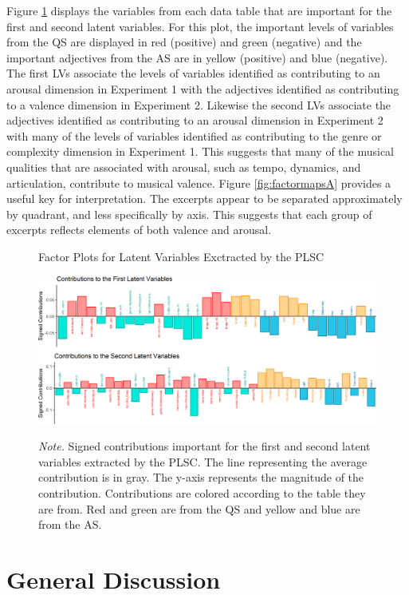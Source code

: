 \documentclass[
  english,
  man,floatsintext]{apa6}
\begin{document}
Figure \ref{fig:contsplsc} displays the variables from each data table that are important for the first and second latent variables. For this plot, the important levels of variables from the QS are displayed in red (positive) and green (negative) and the important adjectives from the AS are in yellow (positive) and blue (negative). The first LVs associate the levels of variables identified as contributing to an arousal dimension in Experiment 1 with the adjectives identified as contributing to a valence dimension in Experiment 2. Likewise the second LVs associate the adjectives identified as contributing to an arousal dimension in Experiment 2 with many of the levels of variables identified as contributing to the genre or complexity dimension in Experiment 1.
This suggests that many of the musical qualities that are associated with arousal, such as tempo, dynamics, and articulation, contribute to musical valence. Figure \ref{fig:factormapsA} provides a useful key for interpretation. The excerpts appear to be separated approximately by quadrant, and less specifically by axis. This suggests that each group of excerpts reflects elements of both valence and arousal.

\begin{figure}   
  \centering  
  \caption{Factor Plots for Latent Variables Exctracted by the PLSC}
    \includegraphics{./Music-Descriptor-Space_files/figure-latex/contsplsccode-1.png}
  \label{fig:contsplsc}
  \caption*{\footnotesize \textit{Note.} Signed contributions important for the first and second latent variables extracted by the PLSC. The line representing the average contribution is in gray. The y-axis represents the magnitude of the contribution. Contributions are colored according to the table they are from. Red and green are from the QS and yellow and blue are from the AS.}
\end{figure}

\hypertarget{general-discussion}{%
\section{General Discussion}\label{general-discussion}}
\end{document}
